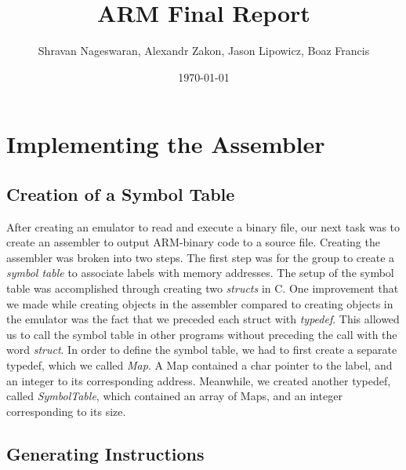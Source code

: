 \documentclass[11pt]{article}
\begin{document}
\title{\textbf{ARM Final Report}}
\author{Shravan Nageswaran, Alexandr Zakon, Jason Lipowicz, Boaz Francis}
\date{\today}

\maketitle

\vspace{0.2in}

\section{Implementing the Assembler}

\subsection{Creation of a Symbol Table}

After creating an emulator to read and execute a binary file, our next task was to create an assembler to output ARM-binary code to a source file. Creating the assembler was broken into two steps. The first step was for the group to create a \emph{symbol table} to associate labels with memory addresses. The setup of the symbol table was accomplished through creating two \emph{structs} in C. One improvement that we made while creating objects in the assembler compared to creating objects in the emulator was the fact that we preceded each struct with \emph{typedef}. This allowed us to call the symbol table in other programs without preceding the call with the word \emph{struct}. In order to define the symbol table, we had to first create a separate typedef, which we called \emph{Map}. A Map contained a char pointer to the label, and an integer to its corresponding address. Meanwhile, we created another typedef, called \emph{SymbolTable}, which contained an array of Maps, and an integer corresponding to its size.

\subsection{Generating Instructions}
\end{document}
